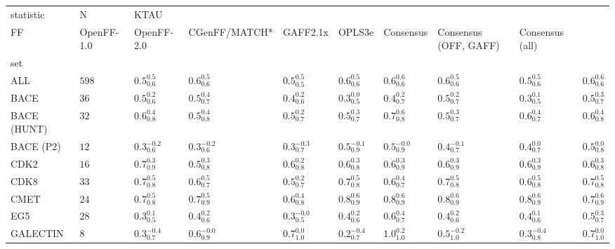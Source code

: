 \begin{tabular}{llllllllll}
\toprule
statistic &      N & \multicolumn{8}{l}{KTAU} \\
FF &          OpenFF-1.0 &           OpenFF-2.0 &        CGenFF/MATCH* &            GAFF2.1x &              OPLS3e &           Consensus & Consensus (OFF, GAFF) &     Consensus (all) \\
set         &        &                     &                      &                      &                     &                     &                     &                       &                     \\
\midrule
ALL         &  $598$ &   $0.5^{0.5}_{0.6}$ &    $0.6^{0.5}_{0.6}$ &    $0.5^{0.5}_{0.5}$ &   $0.6^{0.5}_{0.6}$ &   $0.6^{0.6}_{0.6}$ &   $0.6^{0.5}_{0.6}$ &     $0.5^{0.5}_{0.6}$ &   $0.6^{0.6}_{0.6}$ \\
BACE        &   $36$ &   $0.5^{0.2}_{0.6}$ &    $0.5^{0.4}_{0.7}$ &    $0.4^{0.2}_{0.6}$ &   $0.3^{0.0}_{0.5}$ &   $0.4^{0.2}_{0.7}$ &   $0.5^{0.2}_{0.7}$ &     $0.3^{0.1}_{0.5}$ &   $0.5^{0.3}_{0.7}$ \\
BACE (HUNT) &   $32$ &   $0.6^{0.4}_{0.8}$ &    $0.5^{0.4}_{0.8}$ &    $0.5^{0.2}_{0.7}$ &   $0.5^{0.3}_{0.7}$ &   $0.7^{0.6}_{0.8}$ &   $0.5^{0.3}_{0.7}$ &     $0.6^{0.4}_{0.7}$ &   $0.6^{0.4}_{0.8}$ \\
BACE (P2)   &   $12$ &  $0.3^{-0.2}_{0.6}$ &   $0.3^{-0.2}_{0.6}$ &   $0.3^{-0.3}_{0.7}$ &  $0.5^{-0.1}_{0.9}$ &  $0.5^{-0.0}_{0.9}$ &  $0.4^{-0.1}_{0.7}$ &     $0.4^{0.0}_{0.7}$ &   $0.5^{0.0}_{0.8}$ \\
CDK2        &   $16$ &   $0.7^{0.3}_{0.9}$ &    $0.5^{0.3}_{0.8}$ &    $0.6^{0.2}_{0.8}$ &   $0.6^{0.3}_{0.8}$ &   $0.6^{0.3}_{0.9}$ &   $0.6^{0.3}_{0.9}$ &     $0.6^{0.3}_{0.9}$ &   $0.6^{0.3}_{0.8}$ \\
CDK8        &   $33$ &   $0.7^{0.5}_{0.8}$ &    $0.6^{0.5}_{0.7}$ &    $0.5^{0.2}_{0.7}$ &   $0.7^{0.5}_{0.8}$ &   $0.6^{0.4}_{0.7}$ &   $0.7^{0.5}_{0.8}$ &     $0.6^{0.5}_{0.8}$ &   $0.7^{0.5}_{0.8}$ \\
CMET        &   $24$ &   $0.7^{0.5}_{0.8}$ &    $0.7^{0.5}_{0.9}$ &    $0.6^{0.4}_{0.8}$ &   $0.8^{0.6}_{0.9}$ &   $0.8^{0.6}_{0.9}$ &   $0.8^{0.6}_{0.9}$ &     $0.8^{0.6}_{0.9}$ &   $0.7^{0.6}_{0.9}$ \\
EG5         &   $28$ &   $0.3^{0.1}_{0.5}$ &    $0.4^{0.2}_{0.6}$ &   $0.3^{-0.0}_{0.5}$ &   $0.4^{0.2}_{0.6}$ &   $0.6^{0.4}_{0.7}$ &   $0.4^{0.2}_{0.6}$ &     $0.4^{0.1}_{0.6}$ &   $0.5^{0.3}_{0.7}$ \\
GALECTIN    &    $8$ &  $0.3^{-0.4}_{0.7}$ &   $0.6^{-0.0}_{0.9}$ &    $0.7^{0.0}_{1.0}$ &  $0.2^{-0.4}_{0.7}$ &   $1.0^{0.2}_{1.0}$ &  $0.5^{-0.2}_{1.0}$ &    $0.3^{-0.4}_{0.8}$ &   $0.7^{0.0}_{1.0}$ \\

\end{tabular}
